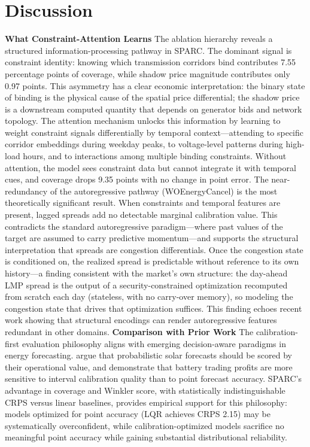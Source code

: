 {\section{Discussion}
\textbf{What Constraint-Attention Learns}
The ablation hierarchy reveals a structured information-processing pathway in SPARC. The dominant signal is constraint identity: knowing which transmission corridors bind contributes 7.55 percentage points of coverage, while shadow price magnitude contributes only 0.97 points. This asymmetry has a clear economic interpretation: the binary state of binding is the physical cause of the spatial price differential; the shadow price is a downstream computed quantity that depends on generator bids and network topology. The attention mechanism unlocks this information by learning to weight constraint signals differentially by temporal context---attending to specific corridor embeddings during weekday peaks, to voltage-level patterns during high-load hours, and to interactions among multiple binding constraints. Without attention, the model sees constraint data but cannot integrate it with temporal cues, and coverage drops 9.35 points with no change in point error.
The near-redundancy of the autoregressive pathway (WOEnergyCancel) is the most theoretically significant result. When constraints and temporal features are present, lagged spreads add no detectable marginal calibration value. This contradicts the standard autoregressive paradigm---where past values of the target are assumed to carry predictive momentum---and supports the structural interpretation that spreads are congestion differentials. Once the congestion state is conditioned on, the realized spread is predictable without reference to its own history---a finding consistent with the market's own structure: the day-ahead LMP spread is the output of a security-constrained optimization recomputed from scratch each day (stateless, with no carry-over memory), so modeling the congestion state that drives that optimization suffices. This finding echoes recent work showing that structural encodings can render autoregressive features redundant in other domains.
\textbf{Comparison with Prior Work}
The calibration-first evaluation philosophy aligns with emerging decision-aware paradigms in energy forecasting. \cite{hobbs2022probabilistic} argue that probabilistic solar forecasts should be scored by their operational value, and \cite{hirsch2026probabilistic} demonstrate that battery trading profits are more sensitive to interval calibration quality than to point forecast accuracy. SPARC's advantage in coverage and Winkler score, with statistically indistinguishable CRPS versus linear baselines, provides empirical support for this philosophy: models optimized for point accuracy (LQR achieves CRPS 2.15) may be systematically overconfident, while calibration-optimized models sacrifice no meaningful point accuracy while gaining substantial distributional reliability.
}
